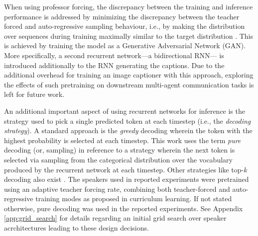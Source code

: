 When using professor forcing, the discrepancy between the training and inference performance is addressed by minimizing the discrepancy between the teacher forced and auto-regressive sampling behaviour, i.e., by making the distribution over sequences during training maximally similar to the target distribution \parencite{lamb2016professor}. This is achieved by training the model as a Generative Adversarial Network (GAN). More specifically, a second recurrent network---a bidirectional RNN---  is introduced additionally to the RNN generating the captions. Due to the additional overhead for training an image captioner with this approach, exploring the effects of such pretraining on downstream multi-agent communication tasks is left for future work.

An additional important aspect of using recurrent networks for inference is the strategy used to pick a single predicted token at each timestep (i.e., the \textit{decoding strategy}). A standard approach is the \textit{greedy} decoding wherein the token with the highest probability is selected at each timestep. %
This work uses the term \textit{pure} decoding (or, sampling) in reference to a strategy wherein the next token is selected via sampling from the categorical distribution over the vocabulary produced by the recurrent network at each timestep. Other strategies like top-$k$ decoding also exist \parencite{lazaridou2020multi}.  
The speakers used in reported experiments were pretrained using an adaptive teacher forcing rate, combining both teacher-forced and auto-regressive training modes as proposed in curriculum learning. If not stated otherwise, pure decoding was used in the reported experiments.  See Appendix \ref{app:grid_search} for details regarding an initial grid search over speaker acrchitectures leading to these design decisions.

